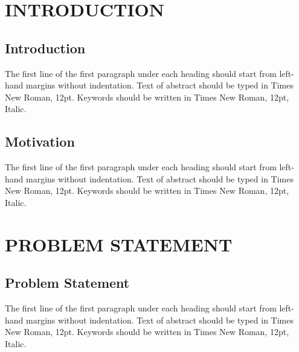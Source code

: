 \documentclass[a4paper, 12pt]{report}
\begin{document}
\newpage
{}
\chapter{INTRODUCTION}
\section{Introduction}
\par The first line of the first paragraph under each heading should start from left-hand margins without indentation.  Text of abstract should be typed in Times New Roman, 12pt. Keywords should be written in Times New Roman, 12pt, Italic.\\
\section{Motivation}
\par The first line of the first paragraph under each heading should start from left-hand margins without indentation.  Text of abstract should be typed in Times New Roman, 12pt. Keywords should be written in Times New Roman, 12pt, Italic.\\
\chapter{PROBLEM  STATEMENT}


\section{Problem Statement}
\par The first line of the first paragraph under each heading should start from left-hand margins without indentation.  Text of abstract should be typed in Times New Roman, 12pt. Keywords should be written in Times New Roman, 12pt, Italic.\\
\end{document}

